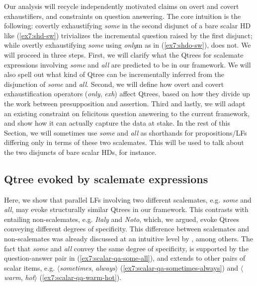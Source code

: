 Our analysis will recycle independently motivated claims on overt and covert exhaustifiers, and constraints on question answering. The core intuition is the following: covertly exhaustifying \textit{some} in the second disjunct of a bare scalar HD like (\ref{ex7:shd-sw}) trivializes the incremental question raised by the first disjunct; while overtly exhaustifying \textit{some} using \textit{only}m as in (\ref{ex7:shdo-sw}), does not. %
We will proceed in three steps. First, we will clarify what the Qtrees for scalemate expressions involving \textit{some} and \textit{all} are predicted to be in our framework. We will also spell out what kind of Qtree can be incrementally inferred from the disjunction of \textit{some} and \textit{all}. Second, we will define how overt and covert exhaustification operators (\textit{only}, \textit{exh}) affect Qtrees, based on how they divide up the work between presupposition and assertion. Third and lastly, we will adapt an existing constraint on felicitous question answering to the current framework, and show how it can actually capture the data at stake. In the rest of this Section, we will sometimes use \textit{some} and \textit{all} as shorthands for propositions/LFs differing only in terms of these two scalemates. This will be used to talk about the two disjuncts of bare scalar HDs, for instance.

\subsection{Qtree evoked by scalemate expressions}

Here, we show that parallel LFs involving two different scalemates, e.g. \textit{some} and \textit{all}, may evoke structurally similar Qtrees in our framework. This contrasts with entailing non-scalemates, e.g. \textit{Italy} and \textit{Noto}, which, we argued, evoke Qtrees conveying different degrees of specificity. This difference between scalemates and non-scalemates was already discussed at an intuitive level by \textcite{Westera2018}, among others. The fact that \textit{some} and \textit{all} convey the same degree of specificity, is supported by the question-answer pair in (\ref{ex7:scalar-qa-some-all}), and extends to other pairs of scalar items, e.g. $\langle$\textit{sometimes}, \textit{always}$\rangle$ (\ref{ex7:scalar-qa-sometimes-always}) and $\langle$\textit{warm}, \textit{hot}$\rangle$ (\ref{ex7:scalar-qa-warm-hot}).

